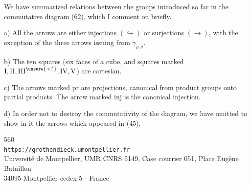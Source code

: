 We have summarized 
relations between the groups introduced so far in the commutative
diagram (62), which I comment on briefly.

a) All the arrows are either injections \((\hookrightarrow)\)
or surjections \((\longrightarrow)\), with the exception
 of the three arrows issuing from \(\gamma_{\rho,\sigma}\).

b) The ten squares (six faces of a cube, and
 squares marked
\(\mathrm I,\mathrm{II},\mathrm{III}^{\unsure{+|'}},
\mathrm{IV},\mathrm V\)) are cartesian.

c) The  arrows marked \(\mathrm{pr}\)
are projections, canonical from product groups onto partial
products. The arrow marked \(\mathrm{inj}\)
is the canonical injection.

d) In order not to destroy the commutativity of the diagram,
we have omitted to show in it the arrows
which appeared in (45).


{\small
\begin{center}
560\\
\texttt{https://grothendieck.umontpellier.fr}\\
Université de Montpellier, UMR CNRS 5149, Case courrier 051, Place Eugène Bataillon\\
34095 Montpellier cedex 5 - France
\end{center}
}


